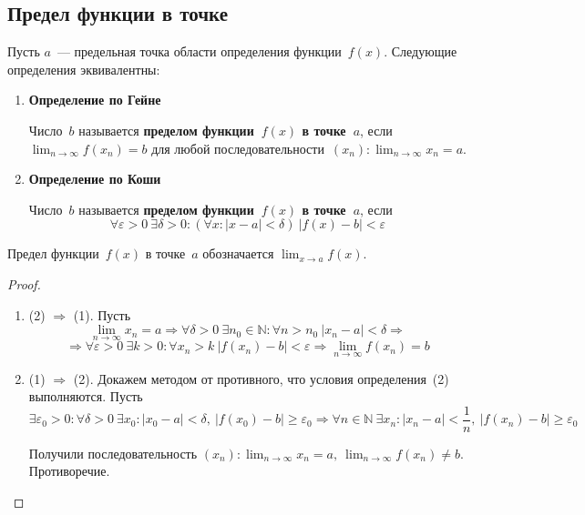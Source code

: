 \subsection{Предел функции в точке}
Пусть $a$~--- предельная точка области определения функции~$f(x)$.
Следующие определения эквивалентны:
\begin{enumerate}
	\item\textbf{Определение по Гейне}
	
	Число~$b$ называется \textbf{пределом функции~$f(x)$ в точке~$a$}, если $\displaystyle \lim_{n \to \infty} f(x_n) = b$ для любой последовательности~$\displaystyle (x_n): \lim_{n \to \infty} x_n = a$.
	
	\item\textbf{Определение по Коши}
	
	Число~$b$ называется \textbf{пределом функции~$f(x)$ в точке~$a$}, если
	\begin{equation*}
	\forall \varepsilon > 0 \ \exists \delta > 0 \colon (\forall x \colon |x - a| < \delta) \ |f(x) - b| < \varepsilon
	\end{equation*}
\end{enumerate}

Предел функции~$f(x)$ в точке~$a$ обозначается $\displaystyle \lim_{x \to a} f(x)$.
\begin{proof}
\begin{enumerate}
	\item (2) $\Rightarrow$ (1).
	Пусть 
	\begin{equation*}
	\lim_{n \to \infty} x_n = a \Rightarrow
	\forall \delta > 0 \ \exists n_0 \in \mathbb N \colon \forall n > n_0 \ |x_n - a| < \delta \Rightarrow
	\end{equation*}
	\begin{equation*}
	\Rightarrow \forall \varepsilon > 0 \ \exists k > 0 \colon \forall x_n > k \ |f(x_n) - b| < \varepsilon \Rightarrow
	\lim_{n \to \infty} f(x_n) = b
	\end{equation*}
	
	\item (1) $\Rightarrow$ (2).
	Докажем методом от противного, что условия определения~(2) выполняются.
	Пусть 
	\begin{equation*}
	\exists \varepsilon_0 > 0 \colon \forall \delta > 0 \ \exists x_0 \colon |x_0 - a| < \delta, \ |f(x_0) - b| \geqslant \varepsilon_0 \Rightarrow
	\forall n \in \mathbb N \ \exists x_n \colon |x_n - a| < \frac1n, \ |f(x_n) - b| \geqslant \varepsilon_0
	\end{equation*}
	
	Получили последовательность $\displaystyle (x_n) \colon \lim_{n \to \infty} x_n = a, \ \lim_{n \to \infty} f(x_n) \neq b$.
	Противоречие.
\end{enumerate}
\end{proof}

